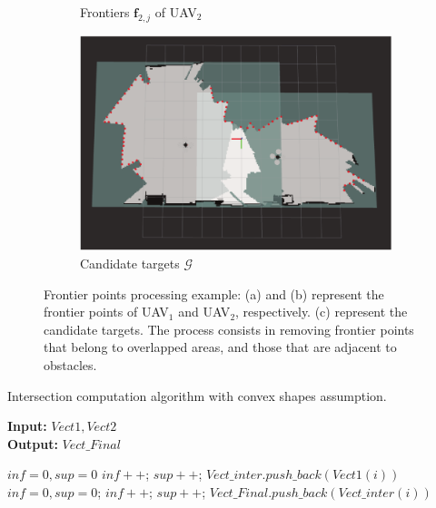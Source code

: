 \documentclass[11pt,openany]{book}
\begin{document}
\begin{figure}[H]
\begin{subfigure}[H]{0.6\linewidth}
        \caption{{Frontiers $\mathbf{f}_{2,j}$ of UAV$_2$}}
        \label{fig:3.5b}
    \end{subfigure}
    \begin{subfigure}[H]{0.6\linewidth}
        \centering
        \includegraphics[width=\linewidth]{assets/3_5_c.png}
        \caption{{Candidate targets $\mathcal{G}$}}
        \label{fig:3.5c}
    \end{subfigure}
    \caption{Frontier points processing example: (a) and (b) represent the frontier points of UAV$_1$ and UAV$_2$, respectively. (c) represent the candidate targets. The process consists in removing frontier points that belong to overlapped areas, and those that are adjacent to obstacles.}
    \label{fig:3.5}
\end{figure}
\begin{algorithm}[H]
    \caption{Intersection computation algorithm with convex shapes assumption.}
    \label{alg:3.3}
    \hspace*{\algorithmicindent} \textbf{Input:} $Vect1, Vect2$ \\
    \hspace*{\algorithmicindent} \textbf{Output:} $Vect\_Final$
    \begin{algorithmic}[1]
        \STATE $inf = 0, sup = 0$
        \STATE $inf++$;
        \ELSE
        \STATE $sup++$;
        \ENDIF
        \ENDFOR
        \STATE $Vect\_inter.push\_back(Vect1(i))$
        \ENDIF
        \ENDFOR
        \STATE $inf=0,sup=0$;
        \STATE $inf++$;
        \ELSE
        \STATE $sup++$;
        \ENDIF
        \ENDFOR
        \STATE $Vect\_Final.push\_back(Vect\_inter(i))$
        \ENDIF
        \ENDFOR
    \end{algorithmic}
\end{algorithm}
\end{document}
